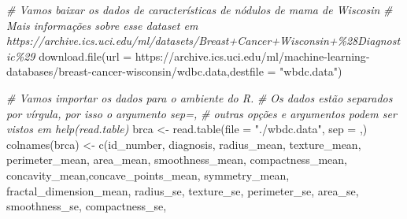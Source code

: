 \documentclass[
]{book}
\newenvironment{Shaded}{\begin{snugshade}}{\end{snugshade}}
\newcommand{\AttributeTok}[1]{\textcolor[rgb]{0.77,0.63,0.00}{#1}}
\newcommand{\CommentTok}[1]{\textcolor[rgb]{0.56,0.35,0.01}{\textit{#1}}}
\newcommand{\FunctionTok}[1]{\textcolor[rgb]{0.00,0.00,0.00}{#1}}
\newcommand{\NormalTok}[1]{#1}
\newcommand{\OtherTok}[1]{\textcolor[rgb]{0.56,0.35,0.01}{#1}}
\newcommand{\StringTok}[1]{\textcolor[rgb]{0.31,0.60,0.02}{#1}}
\begin{document}
\begin{Shaded}
\begin{Highlighting}[]
\CommentTok{\# Vamos baixar os dados de características de nódulos de mama de Wiscosin}
\CommentTok{\# Mais informações sobre esse dataset em https://archive.ics.uci.edu/ml/datasets/Breast+Cancer+Wisconsin+\%28Diagnostic\%29}
\FunctionTok{download.file}\NormalTok{(}\AttributeTok{url =} \StringTok{\textquotesingle{}https://archive.ics.uci.edu/ml/machine{-}learning{-}databases/breast{-}cancer{-}wisconsin/wdbc.data\textquotesingle{}}\NormalTok{,}\AttributeTok{destfile =} \StringTok{"wbdc.data"}\NormalTok{)}

\CommentTok{\# Vamos importar os dados para o ambiente do R.}
\CommentTok{\# Os dados estão separados por vírgula, por isso o argumento sep=\textquotesingle{},\textquotesingle{}}
\CommentTok{\# outras opções e argumentos podem ser vistos em help(read.table)}
\NormalTok{brca }\OtherTok{\textless{}{-}} \FunctionTok{read.table}\NormalTok{(}\AttributeTok{file =} \StringTok{"./wbdc.data"}\NormalTok{, }\AttributeTok{sep =} \StringTok{\textquotesingle{},\textquotesingle{}}\NormalTok{)}
\FunctionTok{colnames}\NormalTok{(brca) }\OtherTok{\textless{}{-}} \FunctionTok{c}\NormalTok{(}\StringTok{\textquotesingle{}id\_number\textquotesingle{}}\NormalTok{, }\StringTok{\textquotesingle{}diagnosis\textquotesingle{}}\NormalTok{, }\StringTok{\textquotesingle{}radius\_mean\textquotesingle{}}\NormalTok{,}
                    \StringTok{\textquotesingle{}texture\_mean\textquotesingle{}}\NormalTok{, }\StringTok{\textquotesingle{}perimeter\_mean\textquotesingle{}}\NormalTok{, }\StringTok{\textquotesingle{}area\_mean\textquotesingle{}}\NormalTok{,}
                    \StringTok{\textquotesingle{}smoothness\_mean\textquotesingle{}}\NormalTok{, }\StringTok{\textquotesingle{}compactness\_mean\textquotesingle{}}\NormalTok{,}
                    \StringTok{\textquotesingle{}concavity\_mean\textquotesingle{}}\NormalTok{,}\StringTok{\textquotesingle{}concave\_points\_mean\textquotesingle{}}\NormalTok{,}
                    \StringTok{\textquotesingle{}symmetry\_mean\textquotesingle{}}\NormalTok{, }\StringTok{\textquotesingle{}fractal\_dimension\_mean\textquotesingle{}}\NormalTok{,}
                    \StringTok{\textquotesingle{}radius\_se\textquotesingle{}}\NormalTok{, }\StringTok{\textquotesingle{}texture\_se\textquotesingle{}}\NormalTok{, }\StringTok{\textquotesingle{}perimeter\_se\textquotesingle{}}\NormalTok{,}
                    \StringTok{\textquotesingle{}area\_se\textquotesingle{}}\NormalTok{, }\StringTok{\textquotesingle{}smoothness\_se\textquotesingle{}}\NormalTok{, }\StringTok{\textquotesingle{}compactness\_se\textquotesingle{}}\NormalTok{,}

\end{Highlighting}
\end{Shaded}
\end{document}
